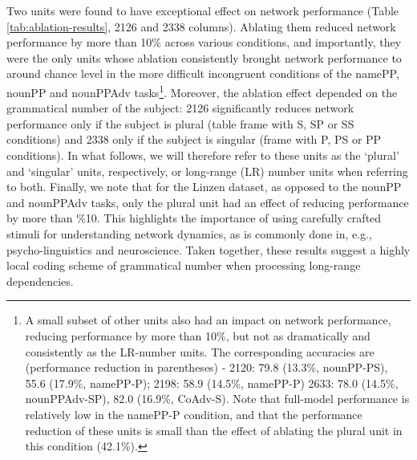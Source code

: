 Two units were found to have exceptional effect on network performance
(Table \ref{tab:ablation-results}, \unit{2}{126} and \unit{2}{338}
columns). Ablating them reduced network performance by more than 10\%
across various conditions, and importantly, they were the only units
whose ablation consistently brought network performance to around
chance level in the more difficult incongruent conditions of the
namePP, nounPP and nounPPAdv tasks\footnote{A small subset of other units
also had an impact on network performance, reducing performance by more than 10\%, but not as dramatically and consistently as the LR-number units. The corresponding accuracies are (performance reduction in parentheses) - \unit{2}{120}: 79.8 (13.3\%, nounPP-PS), 55.6 (17.9\%, namePP-P); \unit{2}{198}: 58.9 (14.5\%, namePP-P) \unit{2}{633}: 78.0 (14.5\%, nounPPAdv-SP), 82.0 (16.9\%, CoAdv-S). Note that full-model performance is relatively low in the namePP-P condition, and that the performance reduction of these units is small than the effect of ablating the plural unit in this condition (42.1\%).}. Moreover, the ablation effect depended on the grammatical number of the subject: \unit{2}{126} significantly reduces
network performance only if the subject is plural (table frame with S, SP or SS conditions) and \unit{2}{338}
only if the subject is singular (frame with P, PS or PP conditions). In what follows, we will therefore
refer to these units as the `plural' and `singular' units, respectively,
or long-range (LR) number units when referring to both. Finally, we note that for the Linzen dataset, as opposed to the nounPP and nounPPAdv tasks, only the plural unit had an effect of reducing performance by more than \%10. This highlights the importance of using carefully crafted stimuli for understanding network dynamics, as is commonly done in, e.g., psycho-linguistics and neuroscience. Taken
together, these results suggest a highly local coding scheme of
grammatical number when processing long-range dependencies.

